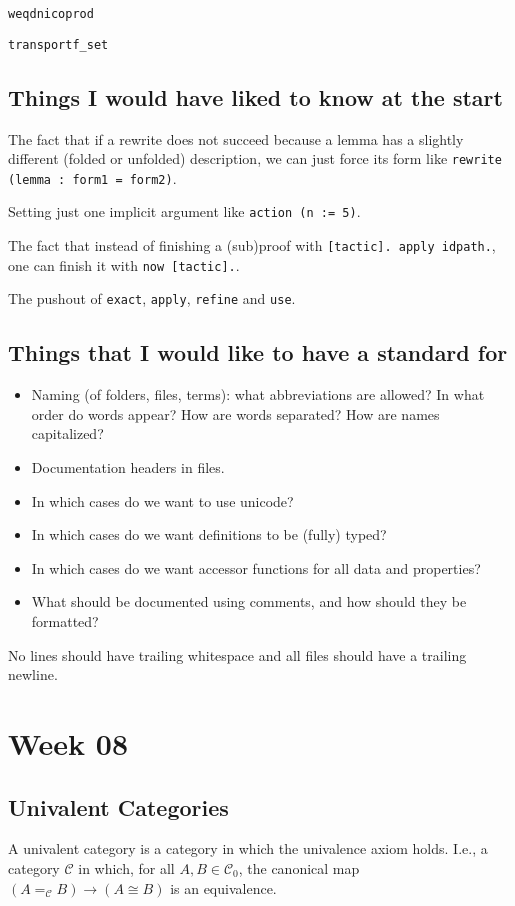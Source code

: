 \documentclass{amsbook}
\newcommand{\Catc}[1]{\mathcal{#1}}
\newcommand{\CC}{\Catc{C}}
\newcommand{\Ob}[1]{{#1}_0}
\theoremstyle{definition}
\begin{document}
  \texttt{weqdnicoprod}

  \texttt{transportf\_set}

  \section{Things I would have liked to know at the start}
  The fact that if a rewrite does not succeed because a lemma has a slightly different (folded or unfolded) description, we can just force its form like \texttt{rewrite (lemma : form1 = form2)}.

  Setting just one implicit argument like \texttt{action (n := 5)}.

  The fact that instead of finishing a (sub)proof with \texttt{[tactic]. apply idpath.}, one can finish it with \texttt{now [tactic].}.

  The pushout of \texttt{exact}, \texttt{apply}, \texttt{refine} and \texttt{use}.

  \section{Things that I would like to have a standard for}
  \begin{itemize}
    \item Naming (of folders, files, terms): what abbreviations are allowed? In what order do words appear? How are words separated? How are names capitalized?
    \item Documentation headers in files.
    \item In which cases do we want to use unicode?
    \item In which cases do we want definitions to be (fully) typed?
    \item In which cases do we want accessor functions for all data and properties?
    \item What should be documented using comments, and how should they be formatted?
  \end{itemize}

  No lines should have trailing whitespace and all files should have a trailing newline.

  \chapter*{Week 08}
  \section{Univalent Categories}
  A univalent category is a category in which the univalence axiom holds. I.e., a category $ \mathcal C $ in which, for all $ A, B \in \Ob \CC $, the canonical map $ (A =_{\mathcal C} B) \to (A \cong B) $ is an equivalence.
\end{document}
